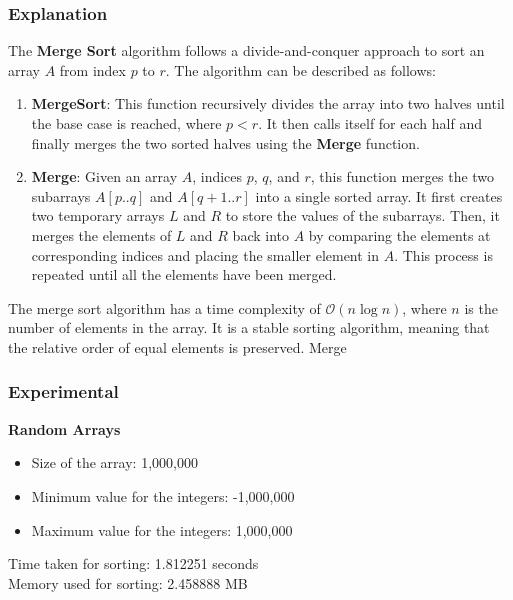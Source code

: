 \documentclass{article}
\begin{document}
\subsubsection{Explanation}


The \textbf{Merge Sort} algorithm follows a divide-and-conquer approach to sort an array $A$ from index $p$ to $r$. The algorithm can be described as follows:

\begin{enumerate}
    \item \textbf{MergeSort}: This function recursively divides the array into two halves until the base case is reached, where $p < r$. It then calls itself for each half and finally merges the two sorted halves using the \textbf{Merge} function.
    \item \textbf{Merge}: Given an array $A$, indices $p$, $q$, and $r$, this function merges the two subarrays $A[p..q]$ and $A[q+1..r]$ into a single sorted array. It first creates two temporary arrays $L$ and $R$ to store the values of the subarrays. Then, it merges the elements of $L$ and $R$ back into $A$ by comparing the elements at corresponding indices and placing the smaller element in $A$. This process is repeated until all the elements have been merged.
\end{enumerate}

The merge sort algorithm has a time complexity of $\mathcal{O}(n\log n)$, where $n$ is the number of elements in the array. It is a stable sorting algorithm, meaning that the relative order of equal elements is preserved. Merge





\subsubsection{Experimental}


\textbf{Random Arrays}

\begin{itemize}
    \item Size of the array: 1,000,000
    \item Minimum value for the integers: -1,000,000
    \item Maximum value for the integers: 1,000,000
\end{itemize}

Time taken for sorting: 1.812251 seconds\\
Memory used for sorting: 2.458888 MB
\end{document}
